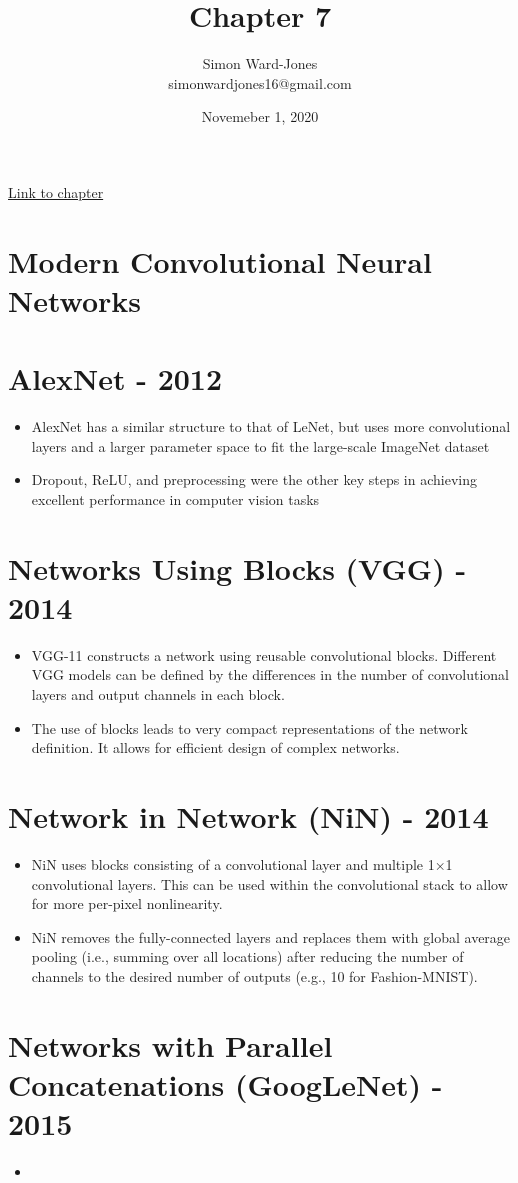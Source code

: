 \documentclass[12pt,notitlepage]{article}
\begin{document}


\title{\Large{\textbf{Chapter 7}}}
\date{Novemeber 1, 2020}
\author{Simon Ward-Jones\\simonwardjones16@gmail.com}

\maketitle
\href{https://d2l.ai/chapter_convolutional-modern/index.html}{Link to chapter}

\section{Modern Convolutional Neural Networks}

\section{AlexNet - 2012}
\begin{itemize}
  \item AlexNet has a similar structure to that of LeNet, but uses more convolutional layers and a larger parameter space to fit the large-scale ImageNet dataset
  \item Dropout, ReLU, and preprocessing were the other key steps in achieving excellent performance in computer vision tasks
\end{itemize}

\section{ Networks Using Blocks (VGG) - 2014 }
\begin{itemize}
  \item VGG-11 constructs a network using reusable convolutional blocks. Different VGG models can be defined by the differences in the number of convolutional layers and output channels in each block.
  \item The use of blocks leads to very compact representations of the network definition. It allows for efficient design of complex networks.
\end{itemize}

\section{ Network in Network (NiN) - 2014 }
\begin{itemize}
  \item NiN uses blocks consisting of a convolutional layer and multiple  1×1  convolutional layers. This can be used within the convolutional stack to allow for more per-pixel nonlinearity.
  \item NiN removes the fully-connected layers and replaces them with global average pooling (i.e., summing over all locations) after reducing the number of channels to the desired number of outputs (e.g., 10 for Fashion-MNIST).
\end{itemize}

\section{ Networks with Parallel Concatenations (GoogLeNet) - 2015 }
\begin{itemize}
  \item 
\end{itemize}



\vfill

\nocite{zhang2020dive}
\end{document}
